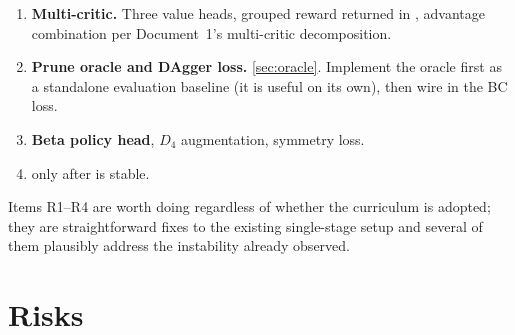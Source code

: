 \documentclass[11pt,a4paper]{article}
\begin{document}
\begin{enumerate}[label=\textbf{R\arabic*.},leftmargin=2.7em]
        stage, blend progress, gate evaluation, and the weight vector pushed to the env via
        . Keep the schedule in one declarative table so it is diffable.
  \item \textbf{Multi-critic.} Three value heads, grouped reward returned in
        , advantage combination per Document~1's multi-critic decomposition.
  \item \textbf{Prune oracle and DAgger loss.} \cref{sec:oracle}. Implement the oracle first
        as a standalone evaluation baseline (it is useful on its own), then wire in the BC
        loss.
  \item \textbf{Beta policy head}, $D_4$ augmentation, symmetry loss.
  \item \textbf{\stageIII{}} only after \stageII{} is stable.
\end{enumerate}

Items R1--R4 are worth doing regardless of whether the curriculum is adopted; they are
straightforward fixes to the existing single-stage setup and several of them plausibly
address the instability already observed.

\section{Risks}
\end{document}
